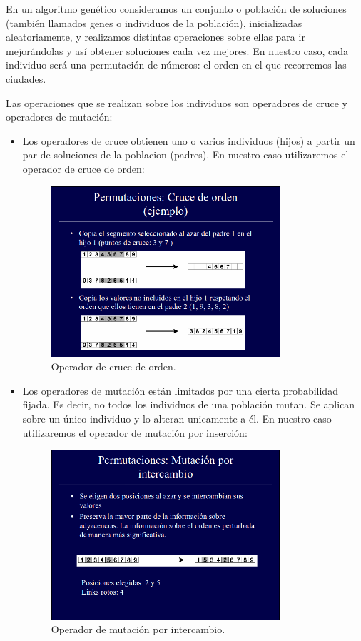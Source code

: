 \documentclass{article}
\begin{document}
En un algoritmo genético consideramos un conjunto o población de soluciones (también llamados genes o individuos de la población), inicializadas aleatoriamente, y realizamos distintas operaciones sobre ellas para ir mejorándolas y así obtener soluciones cada vez mejores. En nuestro caso, cada individuo será una permutación de números: el orden en el que recorremos las ciudades.

Las operaciones que se realizan sobre los individuos son operadores de cruce y operadores de mutación:
\begin{itemize}
	\item Los operadores de cruce obtienen uno o varios individuos (hijos) a partir un par de soluciones de la poblacion (padres). En nuestro caso utilizaremos el operador de cruce de orden:
	
	\begin{figure}[H]
		\centering
		\includegraphics[width=0.8\textwidth]{imag1.png}
		\caption{Operador de cruce de orden.}
	\end{figure}
	
	\item Los operadores de mutación están limitados por una cierta probabilidad fijada. Es decir, no todos los individuos de una población mutan. Se aplican sobre un único individuo y lo alteran unicamente a él. En nuestro caso utilizaremos el operador de mutación por inserción:
	
	\begin{figure}[H]
		\centering
		\includegraphics[width=0.8\textwidth]{imag2.png}
		\caption{Operador de mutación por intercambio.}
	\end{figure}
	
\end{itemize}
 
\end{document}
